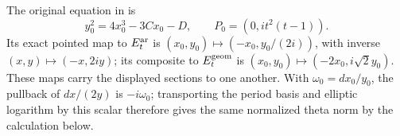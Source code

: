 The original equation in \cite[Remark~3.12, p.~19]{AC2026} is
\[
 y_0^2=4x_0^3-3Cx_0-D,
 \qquad P_0=(0,i t^2(t-1)).
\]
Its exact pointed map to $E_t^{\rm ar}$ is
$(x_0,y_0)\mapsto(-x_0,y_0/(2i))$, with inverse
$(x,y)\mapsto(-x,2iy)$; its composite to $E_t^{\rm geom}$ is
$(x_0,y_0)\mapsto(-2x_0,i\sqrt2y_0)$.
These maps carry the displayed sections to one another.  With
$\omega_0=dx_0/y_0$, the pullback of $dx/(2y)$ is $-i\omega_0$;
transporting the period basis and elliptic logarithm by this scalar
therefore gives the same normalized theta norm by the calculation below.

